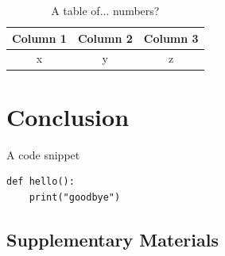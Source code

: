 \documentclass[a4paper,11pt]{article}
\begin{document}
\begin{table}[h!]
    \centering
    \caption{A table of... numbers?}
    \label{tab:numbers?}
    \begin{tabular}{ccc}
        \toprule
        Column 1 & Column 2 & Column 3 \\ \midrule
        x & y & z \\
        \bottomrule
    \end{tabular}
\end{table}

\section{Conclusion}
\begin{listing}[h!]
    \caption{A code snippet}
    \label{code:bye}
    \begin{verbatim}
def hello():
    print("goodbye")
    \end{verbatim}
\end{listing}

\pagebreak
\printbibliography


\pagebreak
\begin{appendices}
    
\section{Supplementary Materials}
    
\end{appendices}
\end{document}
